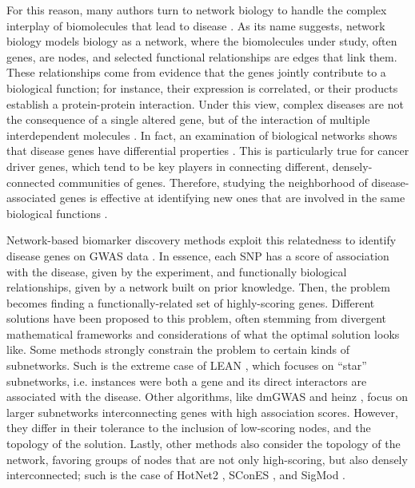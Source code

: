 \documentclass[draft,twocolumn, 11pt]{article}
\begin{document}
For this reason, many authors turn to network biology to handle the complex interplay of biomolecules that lead to disease \cite{furlong_human_2013}. As its name suggests, network biology models biology as a network, where the biomolecules under study, often genes, are nodes, and selected functional relationships are edges that link them. These relationships come from evidence that the genes jointly contribute to a biological function; for instance, their expression is correlated, or their products establish a protein-protein interaction. Under this view, complex diseases are not the consequence of a single altered gene, but of the interaction of multiple interdependent molecules \cite{barabasi_network_2011}. In fact, an examination of biological networks shows that disease genes have differential properties \cite{barabasi_network_2011,pinero_uncovering_2016}. This is particularly true for cancer driver genes, which tend to be key players in connecting different, densely-connected communities of genes. Therefore, studying the neighborhood of disease-associated genes is effective at identifying new ones that are involved in the same biological functions \cite{huang_systematic_2018}. 

Network-based biomarker discovery methods exploit this relatedness to identify disease genes on GWAS data \cite{azencott_network-guided_2016}. In essence, each SNP has a score of association with the disease, given by the experiment, and functionally biological relationships, given by a network built on prior knowledge. Then, the problem becomes finding a functionally-related set of highly-scoring genes. Different solutions have been proposed to this problem, often stemming from divergent mathematical frameworks and considerations of what the optimal solution looks like. Some methods strongly constrain the problem to certain kinds of subnetworks. Such is the extreme case of LEAN \cite{gwinner_network-based_2016}, which focuses on ``star'' subnetworks, i.e. instances were both a gene and its direct interactors are associated with the disease. Other algorithms, like dmGWAS \cite{jia_dmgwas:_2011} and heinz \cite{dittrich_identifying_2008}, focus on larger subnetworks interconnecting genes with high association scores. However, they differ in their tolerance to the inclusion of low-scoring nodes, and the topology of the solution. Lastly, other methods also consider the topology of the network, favoring groups of nodes that are not only high-scoring, but also densely interconnected; such is the case of HotNet2 \cite{leiserson_pan-cancer_2015}, SConES \cite{azencott_efficient_2013}, and SigMod \cite{liu_sigmod:_2017}.
\end{document}
